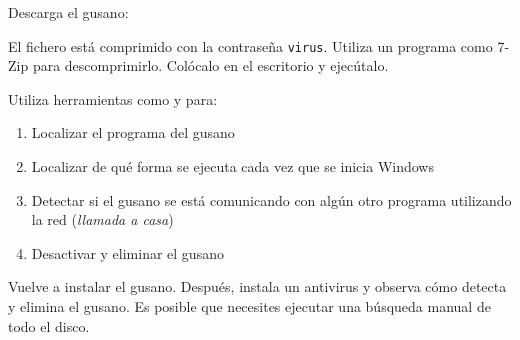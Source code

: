 \begin{homeworkProblem}
  Descarga el gusano:

  \begin{center}
    \begin{minipage}{.8\textwidth}
      \begin{center}
      \end{center}
    \end{minipage}
  \end{center}
  

  El fichero está comprimido con la contraseña \texttt{virus}. Utiliza un programa como 7-Zip para descomprimirlo. Colócalo en el escritorio y ejecútalo.
\end{homeworkProblem}

\begin{homeworkProblem}
  Utiliza herramientas como  y  para:
  \begin{enumerate}
  \item Localizar el programa del gusano
  \item Localizar de qué forma se ejecuta cada vez que se inicia Windows
  \item Detectar si el gusano se está comunicando con algún otro programa utilizando la red (\textit{llamada a casa})
  \item Desactivar y eliminar el gusano
  \end{enumerate}

\end{homeworkProblem}


\begin{homeworkProblem}
  Vuelve a instalar el gusano. Después, instala un antivirus y observa cómo detecta y elimina el gusano. Es posible que necesites ejecutar una búsqueda manual de todo el disco.
\end{homeworkProblem}

